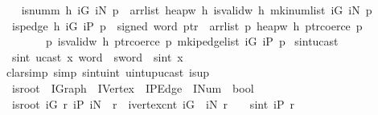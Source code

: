 \begin{isabellebody}
\isanewline
{}\isamarkupfalse%
\ \isanewline
\ \ {\isachardoublequoteopen}is{\isacharunderscore}numm\ h\ iG\ iN\ p\ {\isasymequiv}\ arrlist\ {\isacharparenleft}heap{\isacharunderscore}w{}{}\ h{\isacharparenright}\ {\isacharparenleft}is{\isacharunderscore}valid{\isacharunderscore}w{}{}\ h{\isacharparenright}\ {\isacharparenleft}mk{\isacharunderscore}inum{\isacharunderscore}list\ iG\ iN{\isacharparenright}\ p{\isachardoublequoteclose}\isanewline
\isanewline
{}\isamarkupfalse%
\isanewline
\ \ {\isachardoublequoteopen}is{\isacharunderscore}pedge\ h\ iG\ iP\ {\isacharparenleft}p{\isacharcolon}{\isacharcolon}\ {}{}\ signed\ word\ ptr{\isacharparenright}\ {\isasymequiv}\ arrlist\ {\isacharparenleft}{\isasymlambda}p{\isachardot}\ heap{\isacharunderscore}w{}{}\ h\ {\isacharparenleft}ptr{\isacharunderscore}coerce\ p{\isacharparenright}{\isacharparenright}\isanewline
\ \ \ \ \ \ \ \ {\isacharparenleft}{\isasymlambda}p{\isachardot}\ is{\isacharunderscore}valid{\isacharunderscore}w{}{}\ h\ {\isacharparenleft}ptr{\isacharunderscore}coerce\ p{\isacharparenright}{\isacharparenright}\ {\isacharparenleft}mk{\isacharunderscore}ipedge{\isacharunderscore}list\ iG\ iP{\isacharparenright}\ p{\isachardoublequoteclose}\isanewline
\isanewline
{}\isamarkupfalse%
\ sint{\isacharunderscore}ucast{\isacharcolon}\ \isanewline
\ \ {\isachardoublequoteopen}sint\ {\isacharparenleft}ucast\ {\isacharparenleft}x\ {\isacharcolon}{\isacharcolon}word{}{}{\isacharparenright}\ {\isacharcolon}{\isacharcolon}\ sword{}{}{\isacharparenright}\ {\isacharequal}\ sint\ x{\isachardoublequoteclose}\isanewline
%
\isadelimproof
\ \ %
\endisadelimproof
%
\isatagproof
{}\isamarkupfalse%
\ {\isacharparenleft}clarsimp\ simp{\isacharcolon}\ sint{\isacharunderscore}uint\ uint{\isacharunderscore}up{\isacharunderscore}ucast\ is{\isacharunderscore}up{\isacharparenright}%
\endisatagproof
{\isafoldproof}%
%
\isadelimproof
\isanewline
%
\endisadelimproof
\isanewline
{}\isamarkupfalse%
\ \isanewline
\ \ is{\isacharunderscore}root\ {\isacharcolon}{\isacharcolon}\ {\isachardoublequoteopen}IGraph\ {\isasymRightarrow}\ IVertex\ {\isasymRightarrow}\ IPEdge\ {\isasymRightarrow}\ INum\ {\isasymRightarrow}\ bool{\isachardoublequoteclose}\ \isanewline
{}\ \isanewline
\ \ {\isachardoublequoteopen}is{\isacharunderscore}root\ iG\ r\ iP\ iN\ {\isasymequiv}\ r\ {\isacharless}\ {\isacharparenleft}ivertex{\isacharunderscore}cnt\ iG{\isacharparenright}\ {\isasymand}\ {\isacharparenleft}iN\ r\ {\isacharequal}\ {}{\isacharparenright}\ {\isasymand}\ {\isacharparenleft}sint\ {\isacharparenleft}iP\ r{\isacharparenright}\ {\isacharless}\ {}{\isacharparenright}{\isachardoublequoteclose}\isanewline

\end{isabellebody}
